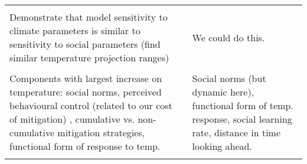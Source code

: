 \documentclass[10pt]{article} %
\begin{document}
\begin{table}[H]
\begin{tabular}{m{25em}|m{25em}}
& \\
Demonstrate that model sensitivity to climate parameters is similar to sensitivity to social parameters (find similar temperature projection ranges) & We could do this.\\
& \\
Components with largest increase on temperature: social norms, perceived behavioural control (related to our cost of mitigation) , cumulative vs. non-cumulative mitigation strategies, functional form of response to temp. & Social norms (but dynamic here), functional form of temp. response, social learning rate, distance in time looking ahead. \\
& \\

\end{tabular}
\end{table}















\pagebreak



\end{document}

